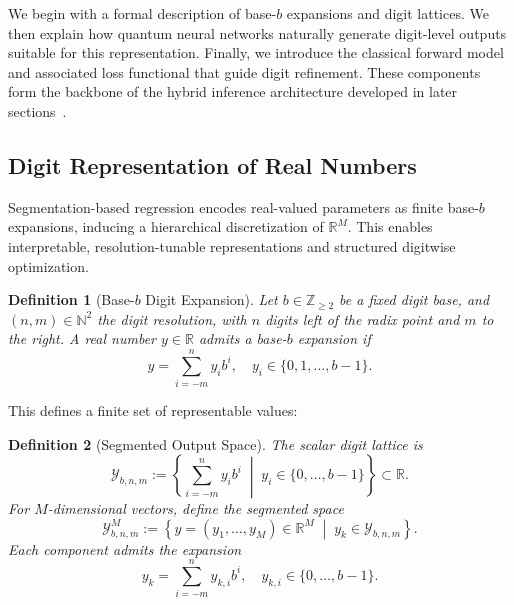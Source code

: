 \documentclass[aps,twocolumn,superscriptaddress,nofootinbib]{revtex4}
\newtheorem{definition}{Definition}
\begin{document}
We begin with a formal description of base-$b$ expansions and digit lattices. We then explain how quantum neural networks naturally generate digit-level outputs suitable for this representation. Finally, we introduce the classical forward model and associated loss functional that guide digit refinement. These components form the backbone of the hybrid inference architecture developed in later sections~\cite{cerezo2021variational, arute2019quantum, brassard2002quantum, schuld2019feature}.
\subsection{Digit Representation of Real Numbers}
Segmentation-based regression encodes real-valued parameters as finite base-$b$ expansions, inducing a hierarchical discretization of $\mathbb{R}^M$. This enables interpretable, resolution-tunable representations and structured digitwise optimization.

\begin{definition}[Base-$b$ Digit Expansion]\label{def:digit_representation}
Let $b \in \mathbb{Z}_{\geq 2}$ be a fixed digit base, and $(n,m) \in \mathbb{N}^2$ the digit resolution, with $n$ digits left of the radix point and $m$ to the right. A real number $y \in \mathbb{R}$ admits a base-$b$ expansion if
\begin{equation}
y = \sum_{i=-m}^{n} y_i b^i, \quad y_i \in \{0,1,\ldots,b-1\}.
\end{equation}
\end{definition}

\noindent This defines a finite set of representable values:

\begin{definition}[Segmented Output Space]
The scalar digit lattice is
\begin{equation}
\mathcal{Y}_{b,n,m} := \left\{ \sum_{i=-m}^{n} y_i b^i \;\middle|\; y_i \in \{0, \ldots, b-1\} \right\} \subset \mathbb{R}.
\end{equation}
For $M$-dimensional vectors, define the segmented space
\begin{equation}
\mathcal{Y}^{M}_{b,n,m} := \left\{ y = (y_1, \ldots, y_M) \in \mathbb{R}^M \;\middle|\; y_k \in \mathcal{Y}_{b,n,m} \right\}.
\end{equation}
Each component admits the expansion
\begin{equation}
y_k = \sum_{i=-m}^{n} y_{k,i} b^i, \quad y_{k,i} \in \{0,\ldots,b-1\}.
\end{equation}
\end{definition}
\end{document}
